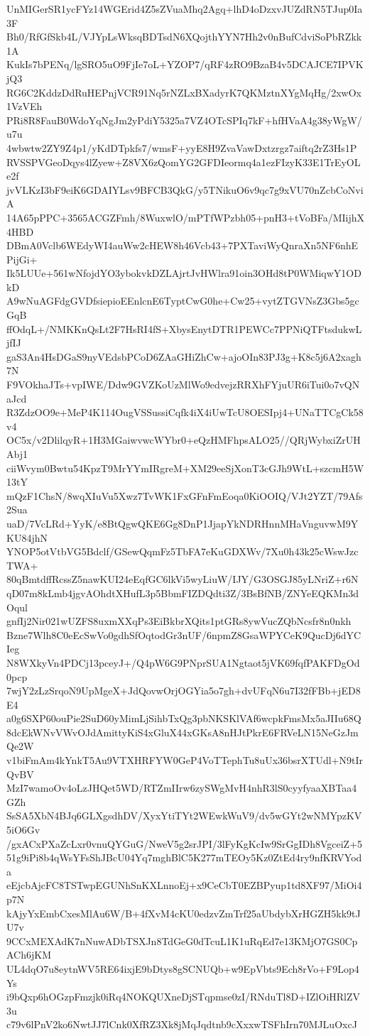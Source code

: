 UnMIGerSR1ycFYz14WGErid4Z5sZVuaMhq2Agq+lhD4oDzxvJUZdRN5TJup0Ia3F
Bh0/RfGfSkb4L/VJYpLsWksqBDTsdN6XQojthYYN7Hh2v0nBufCdviSoPbRZkk1A
KukIs7bPENq/lgSRO5uO9FjIe7oL+YZOP7/qRF4zRO9BzaB4v5DCAJCE7IPVKjQ3
RG6C2KddzDdRuHEPnjVCR91Nq5rNZLxBXadyrK7QKMztnXYgMqHg/2xwOx1VzVEh
PRi8R8FauB0WdoYqNgJm2yPdiY5325a7VZ4OTcSPIq7kF+hfHVaA4g38yWgW/u7u
4wbwtw2ZY9Z4p1/yKdDTpkfs7/wmsF+yyE8H9ZvaVawDxtzrgz7aiftq2rZ3Hs1P
RVSSPVGeoDqys4lZyew+Z8VX6zQomYG2GFDIeormq4a1ezFIzyK33E1TrEyOLe2f
jvVLKzI3bF9eiK6GDAIYLsv9BFCB3QkG/y5TNikuO6v9qc7g9xVU70nZcbCoNviA
14A65pPPC+3565ACGZFmh/8WuxwlO/mPTfWPzbh05+pnH3+tVoBFa/MIijhX4HBD
DBmA0Vclb6WEdyWI4auWw2cHEW8h46Vcb43+7PXTaviWyQnraXn5NF6nhEPijGi+
Ik5LUUe+561wNfojdYO3ybokvkDZLAjrtJvHWlra91oin3OHd8tP0WMiqwY1ODkD
A9wNuAGFdgGVDfsiepioEEnlcnE6TyptCwG0he+Cw25+vytZTGVNsZ3Gbs5gcGqB
ffOdqL+/NMKKnQsLt2F7HsRI4fS+XbysEnytDTR1PEWCc7PPNiQTFtsdukwLjfIJ
gaS3An4HsDGaS9nyVEdsbPCoD6ZAaGHiZhCw+ajoOIn83PJ3g+K8c5j6A2xagh7N
F9VOkhaJTs+vpIWE/Ddw9GVZKoUzMlWo9edvejzRRXhFYjuUR6iTui0o7vQNaJcd
R3ZdzOO9e+MeP4K114OugVSSussiCqfk4iX4iUwTcU8OESIpj4+UNaTTCgCk58v4
OC5x/v2DlilqyR+1H3MGaiwvwcWYbr0+eQzHMFhpsALO25//QRjWybxiZrUHAbj1
ciiWvym0Bwtu54KpzT9MrYYmIRgreM+XM29eeSjXonT3cGJh9WtL+szcmH5W13tY
mQzF1ChsN/8wqXIuVu5Xwz7TvWK1FxGFnFmEoqa0KiOOIQ/VJt2YZT/79Afs2Sua
uaD/7VcLRd+YyK/e8BtQgwQKE6Gg8DnP1JjapYkNDRHnnMHaVnguvwM9YKU84jhN
YNOP5otVtbVG5Bdclf/GSewQqmFz5TbFA7eKuGDXWv/7Xu0h43k25cWswJzcTWA+
80qBmtdffRcssZ5nawKUI24eEqfGC6lkVi5wyLiuW/IJY/G3OSGJ85yLNriZ+r6N
qD07m8kLmb4jgvAOhdtXHufL3p5BbmFIZDQdti3Z/3BsBfNB/ZNYeEQKMn3dOqul
gnfIj2Nir021wUZFS8uxmXXqPs3EiBkbrXQits1ptGRs8ywVucZQbNcsfr8n0nkh
Bzne7Wlh8C0eEcSwVo0gdhSfOqtodGr3nUF/6npmZ8GsaWPYCeK9QucDj6dYCIeg
N8WXkyVn4PDCj13pceyJ+/Q4pW6G9PNprSUA1Ngtaot5jVK69fqfPAKFDgOd0pcp
7wjY2zLzSrqoN9UpMgeX+JdQovwOrjOGYia5o7gh+dvUFqN6u7I32fFBb+jED8E4
a0g6SXP60ouPie2SuD60yMimLjSihbTxQg3pbNKSKlVAf6wcpkFmsMx5aJIIu68Q
8dcEkWNvVWvOJdAmittyKiS4xGluX44xGKsA8nHJtPkrE6FRVeLN15NeGzJmQe2W
v1biFmAm4kYnkT5Au9VTXHRFYW0GeP4VoTTephTu8uUx36bsrXTUdl+N9tIrQvBV
MzI7wamoOv4oLzJHQet5WD/RTZmIIrw6zySWgMvH4nhR3lS0cyyfyaaXBTaa4GZh
SsSA5XbN4BJq6GLXgsdhDV/XyxYtiTYt2WEwkWuV9/dv5wGYt2wNMYpzKV5iO6Gv
/gxACxPXaZcLxr0vnuQYGuG/NweV5g2srJPI/3lFyKgKcIw9SrGgIDh8VgceiZ+5
51g9iPi8b4qWsYFsShJBcU04Yq7mghBlC5K277mTEOy5Kz0ZtEd4ry9nfKRVYoda
eEjcbAjcFC8TSTwpEGUNhSnKXLnnoEj+x9CeCbT0EZBPyup1td8XF97/MiOi4p7N
kAjyYxEmbCxesMlAu6W/B+4fXvM4cKU0edzvZmTrf25aUbdybXrHGZH5kk9tJU7v
9CCxMEXAdK7nNuwADbTSXJn8TdGeG0dTcuL1K1uRqEd7e13KMjO7GS0CpACh6jKM
UL4dqO7u8eytnWV5RE64ixjE9bDtys8gSCNUQb+w9EpVbts9Ech8rVo+F9Lop4Ys
i9bQxp6hOGzpFmzjk0iRq4NOKQUXneDjSTqpmse0zI/RNduTl8D+IZlOiHRlZV3u
c79v6lPnV2ko6NwtJJ7lCnk0XfRZ3Xk8jMqJqdtnb9cXxxwTSFhIrn70MJLuOxcJ
